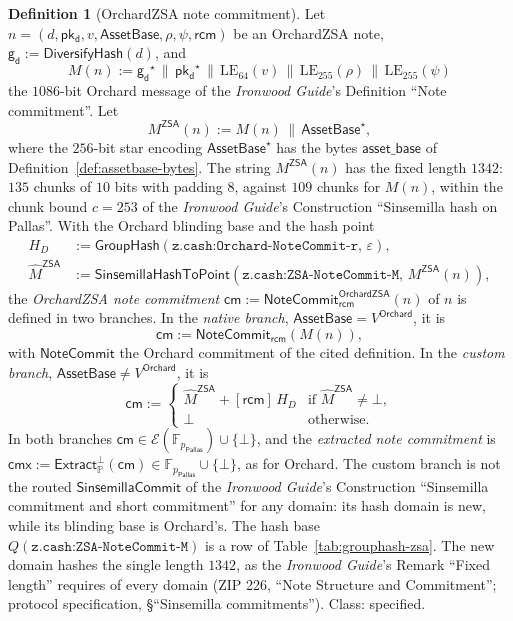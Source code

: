 \documentclass[11pt,a4paper]{article}
\theoremstyle{definition}
\newtheorem{definition}[theorem]{Definition}
\newcommand{\F}{\mathbb{F}}
\newcommand{\PP}{\mathbb{P}}
\newcommand{\cmsym}{\mathsf{cm}}
\newcommand{\cmx}{\mathsf{cmx}}
\newcommand{\Pallas}{\ensuremath{\mathsf{Pallas}}}
\newcommand{\Ep}{\ensuremath{\mathcal{E}}}
\newcommand{\NoteCommit}{\ensuremath{\mathsf{NoteCommit}}}
\newcommand{\Extract}{\ensuremath{\mathsf{Extract}}}
\newcommand{\GroupHash}{\ensuremath{\mathsf{GroupHash}}}
\newcommand{\pkd}{\ensuremath{\mathsf{pk_d}}}
\newcommand{\gd}{\ensuremath{\mathsf{g_d}}}
\newcommand{\rcm}{\ensuremath{\mathsf{rcm}}}
\begin{document}
\begin{definition}[OrchardZSA note commitment]\label{def:zsa-notecommit}
Let $n = (d, \pkd, v, \mathsf{AssetBase}, \rho, \psi, \rcm)$ be an
OrchardZSA note, $\gd := \mathsf{DiversifyHash}(d)$, and
\[
  M(n) := \gd^{\star} \,\|\, \pkd^{\star} \,\|\, \mathrm{LE}_{64}(v)
    \,\|\, \mathrm{LE}_{255}(\rho) \,\|\, \mathrm{LE}_{255}(\psi)
\]
the $1086$-bit Orchard message of the \emph{Ironwood Guide}'s Definition
``Note commitment''. Let
\[
  M^{\mathsf{ZSA}}(n) := M(n) \,\|\, \mathsf{AssetBase}^{\star},
\]
where the $256$-bit star encoding $\mathsf{AssetBase}^{\star}$ has the bytes
$\mathsf{asset\_base}$ of Definition~\ref{def:assetbase-bytes}. The string
$M^{\mathsf{ZSA}}(n)$ has the fixed length $1342$: $135$ chunks of $10$
bits with padding $8$, against $109$ chunks for $M(n)$, within the chunk
bound $c = 253$ of the \emph{Ironwood Guide}'s Construction ``Sinsemilla
hash on Pallas''. With the Orchard blinding base and the hash point
\begin{align*}
  H_D &:= \GroupHash(\texttt{z.cash:Orchard-NoteCommit-r},\,
    \varepsilon), \\
  \hat{M}^{\mathsf{ZSA}} &:= \mathsf{SinsemillaHashToPoint}(
    \texttt{z.cash:ZSA-NoteCommit-M},\, M^{\mathsf{ZSA}}(n)),
\end{align*}
the \emph{OrchardZSA note commitment}
$\cmsym := \NoteCommit^{\mathsf{OrchardZSA}}_{\rcm}(n)$ of $n$ is defined
in two branches. In the \emph{native branch},
$\mathsf{AssetBase} = V^{\mathsf{Orchard}}$, it is
\[
  \cmsym := \NoteCommit_{\rcm}(M(n)),
\]
with $\NoteCommit$ the Orchard commitment of the cited definition. In the
\emph{custom branch}, $\mathsf{AssetBase} \neq V^{\mathsf{Orchard}}$, it is
\[
  \cmsym :=
  \begin{cases}
    \hat{M}^{\mathsf{ZSA}} + [\rcm]\,H_D
      & \text{if } \hat{M}^{\mathsf{ZSA}} \neq \bot, \\
    \bot & \text{otherwise}.
  \end{cases}
\]
In
both branches $\cmsym \in \Ep(\F_{p_{\Pallas}}) \cup \{\bot\}$, and the
\emph{extracted note commitment} is
$\cmx := \Extract_{\PP}^{\bot}(\cmsym) \in \F_{p_{\Pallas}} \cup \{\bot\}$,
as for Orchard. The custom branch is not the routed
$\mathsf{SinsemillaCommit}$ of the \emph{Ironwood Guide}'s Construction
``Sinsemilla commitment and short commitment'' for any domain: its hash
domain is new, while its blinding base is Orchard's. The hash base
$Q(\texttt{z.cash:ZSA-NoteCommit-M})$ is a row of
Table~\ref{tab:grouphash-zsa}. The new domain hashes the single length
$1342$, as the \emph{Ironwood Guide}'s Remark ``Fixed length'' requires of
every domain (ZIP 226, ``Note Structure and Commitment''; protocol
specification, \S``Sinsemilla commitments''). Class: specified.
\end{definition}
\end{document}
